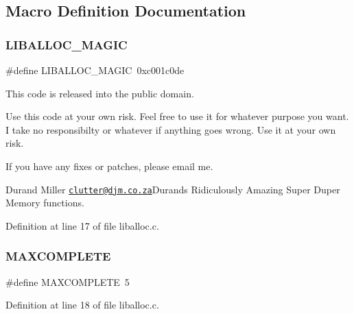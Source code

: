 \subsection{Macro Definition Documentation}
\mbox{\label{a00023_af6b1d459ffa3c81e2456acf8d4268330_af6b1d459ffa3c81e2456acf8d4268330}} 
\subsubsection{\texorpdfstring{L\+I\+B\+A\+L\+L\+O\+C\+\_\+\+M\+A\+G\+IC}{LIBALLOC\_MAGIC}}
{\footnotesize\ttfamily \#define L\+I\+B\+A\+L\+L\+O\+C\+\_\+\+M\+A\+G\+IC~0xc001c0de}



This code is released into the public domain. 

Use this code at your own risk. Feel free to use it for whatever purpose you want. I take no responsibilty or whatever if anything goes wrong. Use it at your own risk.

If you have any fixes or patches, please email me.

Durand Miller \href{mailto:clutter@djm.co.za}{\tt clutter@djm.\+co.\+za}Durand\textquotesingle{}s Ridiculously Amazing Super Duper Memory functions. 

Definition at line 17 of file liballoc.\+c.

\mbox{\label{a00023_a08b7f1e029a0c835f3639557d8ad7a36_a08b7f1e029a0c835f3639557d8ad7a36}} 
\subsubsection{\texorpdfstring{M\+A\+X\+C\+O\+M\+P\+L\+E\+TE}{MAXCOMPLETE}}
{\footnotesize\ttfamily \#define M\+A\+X\+C\+O\+M\+P\+L\+E\+TE~5}



Definition at line 18 of file liballoc.\+c.

\mbox{\label{a00023_af823bb7d083fafbd662be7ea09582013_af823bb7d083fafbd662be7ea09582013}} 
